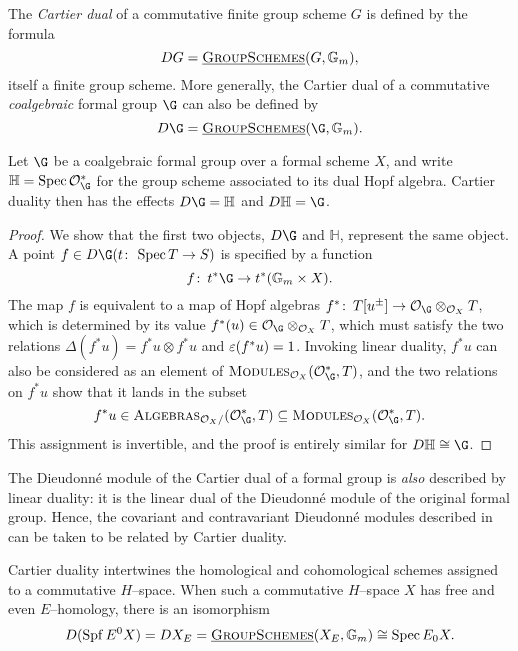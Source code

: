 \begin{definition}\label{DefnCartierDual}
The \textit{Cartier dual} of a commutative finite group scheme \(G\) is defined by the formula \[DG = \operatorname{\underline{\smash{\normalfont\textsc{GroupSchemes}}}}(G, \mathbb G_m),\] itself a finite group scheme.  More generally, the Cartier dual of a commutative \emph{coalgebraic} formal group \(\G\) can also be defined by \[D\G = \InternalHom{GroupSchemes}(\G, \Gm).\]
\end{definition}

\begin{lemma}
Let \(\G\) be a coalgebraic formal group over a formal scheme \(X\), and write \(\mathbb H = \Spec \sheaf O_{\G}^*\) for the group scheme associated to its dual Hopf algebra.  Cartier duality then has the effects \(D\G = \mathbb H\) and \(D\mathbb H = \G\).
\end{lemma}
\begin{proof}
We show that the first two objects, \(D\G\) and \(\mathbb H\), represent the same object.  A point \(f \in D\G(t\co \Spec T \to S)\) is specified by a function \[f\co t^* \G \to t^*(\Gm \times X).\]  The map \(f\) is equivalent to a map of Hopf algebras \(f^*\co T[u^\pm] \to \sheaf O_{\G} \otimes_{\sheaf O_X} T\), which is determined by its value \(f^*(u) \in \sheaf O_{\G} \otimes_{\sheaf O_X} T\), which must satisfy the two relations \(\Delta(f^* u) = f^* u \otimes f^* u\) and \(\varepsilon(f^* u) = 1\).  Invoking linear duality, \(f^* u\) can also be considered as an element of \(\CatOf{Modules}_{\sheaf O_X}(\sheaf O_{\G}^*, T)\), and the two relations on \(f^* u\) show that it lands in the subset \[f^* u \in \CatOf{Algebras}_{\sheaf O_X /}(\sheaf O_{\G}^*, T) \subseteq \CatOf{Modules}_{\sheaf O_X}(\sheaf O_{\G}^*, T).\]  This assignment is invertible, and the proof is entirely similar for \(D \mathbb H \cong \G\).
\end{proof}

\begin{remark}
The Dieudonn\'e module of the Cartier dual of a formal group is \emph{also} described by linear duality: it is the linear dual of the Dieudonn\'e module of the original formal group.  Hence, the covariant and contravariant Dieudonn\'e modules described in  can be taken to be related by Cartier duality.
\end{remark}

\begin{remark}\label{TopologicalCartierDuality}
Cartier duality intertwines the homological and cohomological schemes assigned to a commutative \(H\)--space.  When such a commutative \(H\)--space \(X\) has free and even \(E\)--homology, there is an isomorphism \[D(\operatorname{Spf} E^0 X) = DX_E = \operatorname{\underline{\smash{\normalfont\textsc{GroupSchemes}}}}(X_E, \mathbb G_m) \cong \operatorname{Spec} E_0 X.\]
\end{remark}












